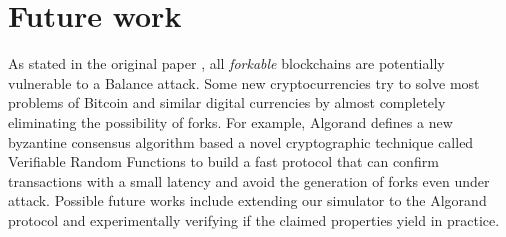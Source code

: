 \section{Future work}
As stated in the original paper \cite{balance_attack_2017}, all \textit{forkable} blockchains are potentially vulnerable to a Balance attack.
Some new cryptocurrencies try to solve most problems of Bitcoin and similar digital currencies by almost completely eliminating the possibility of forks.
For example, Algorand \cite{algorand_2017} defines a new byzantine consensus algorithm based a novel cryptographic technique called Verifiable Random Functions to build a fast protocol that can confirm transactions with a small latency and avoid the generation of forks even under attack.
Possible future works include extending our simulator to the Algorand protocol and experimentally verifying if the claimed properties yield in practice.
